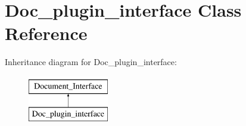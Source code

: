 \hypertarget{classDoc__plugin__interface}{\section{Doc\-\_\-plugin\-\_\-interface Class Reference}
\label{classDoc__plugin__interface}
}
Inheritance diagram for Doc\-\_\-plugin\-\_\-interface\-:\begin{figure}[H]
\begin{center}
\leavevmode
\includegraphics[height=2.000000cm]{classDoc__plugin__interface}
\end{center}
\end{figure}
